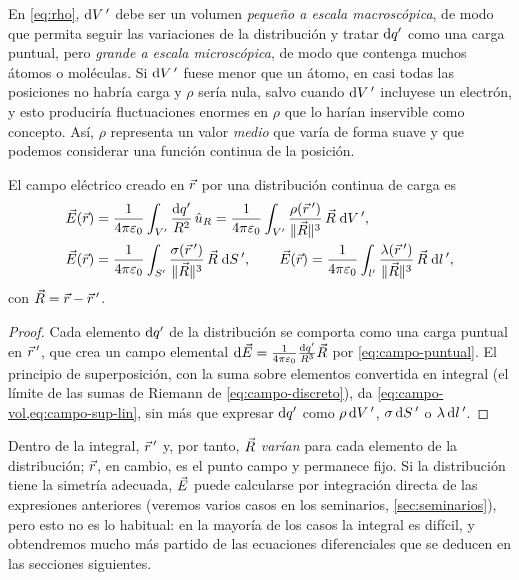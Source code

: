 \begin{observacion}\label{obs:macro}
En \cref{eq:rho}, $\mathrm{d} V\,'$ debe ser un volumen \emph{pequeño a escala macroscópica}, de modo que permita seguir las
variaciones de la distribución y tratar $\mathrm{d} q'$ como una carga puntual, pero \emph{grande a escala microscópica},
de modo que contenga muchos átomos o moléculas. Si $\mathrm{d} V\,'$ fuese menor que un átomo, en casi todas las posiciones no
habría carga y $\rho$ sería nula, salvo cuando $\mathrm{d} V\,'$ incluyese un electrón, y esto produciría fluctuaciones enormes en
$\rho$ que lo harían inservible como concepto. Así, $\rho$ representa un valor \emph{medio} que varía de forma suave
y que podemos considerar una función continua de la posición.
\end{observacion}

\begin{proposicion}\label{prop:campo-continuo}
El campo eléctrico creado en $\vec{r}$ por una distribución continua de carga es
\begin{align}
  \vec{E}(\vec{r})&=\frac{1}{4\pi\varepsilon_{0}}\int_{V'}\frac{\mathrm{d} q'}{R^{2}}\,\hat{u}_{R}
  =\frac{1}{4\pi\varepsilon_{0}}\int_{V'}\frac{\rho(\vec{r}\,')}{\lVert \vec{R}\rVert^{3}}\,\vec{R}\;\mathrm{d} V\,',\label{eq:campo-vol}\\
  \vec{E}(\vec{r})&=\frac{1}{4\pi\varepsilon_{0}}\int_{S'}\frac{\sigma(\vec{r}\,')}{\lVert \vec{R}\rVert^{3}}\,\vec{R}\;\mathrm{d} S\,',\qquad
  \vec{E}(\vec{r})=\frac{1}{4\pi\varepsilon_{0}}\int_{l'}\frac{\lambda(\vec{r}\,')}{\lVert \vec{R}\rVert^{3}}\,\vec{R}\;\mathrm{d} l\,',\label{eq:campo-sup-lin}
\end{align}
con $\vec{R}=\vec{r}-\vec{r}\,'$.
\end{proposicion}
\begin{proof}
Cada elemento $\mathrm{d} q'$ de la distribución se comporta como una carga puntual en $\vec{r}\,'$, que crea un campo
elemental $\mathrm{d}\vec{E}=\frac{1}{4\pi\varepsilon_{0}}\frac{\mathrm{d} q'}{R^{3}}\vec{R}$ por \cref{eq:campo-puntual}. El principio de
superposición, con la suma sobre elementos convertida en integral (el límite de las sumas de
Riemann de \cref{eq:campo-discreto}), da \cref{eq:campo-vol,eq:campo-sup-lin}, sin más que expresar
$\mathrm{d} q'$ como $\rho\,\mathrm{d} V\,'$, $\sigma\,\mathrm{d} S\,'$ o $\lambda\,\mathrm{d} l\,'$.
\end{proof}

\begin{observacion}\label{obs:variables}
Dentro de la integral, $\vec{r}\,'$ y, por tanto, $\vec{R}$ \emph{varían} para cada elemento de la distribución;
$\vec{r}$, en cambio, es el punto campo y permanece fijo. Si la distribución tiene la simetría adecuada, $\vec{E}$ puede
calcularse por integración directa de las expresiones anteriores (veremos varios casos en los
seminarios, \cref{sec:seminarios}), pero esto no es lo habitual: en la mayoría de los casos la integral es difícil, y
obtendremos mucho más partido de las ecuaciones diferenciales que se deducen en las secciones siguientes.
\end{observacion}

